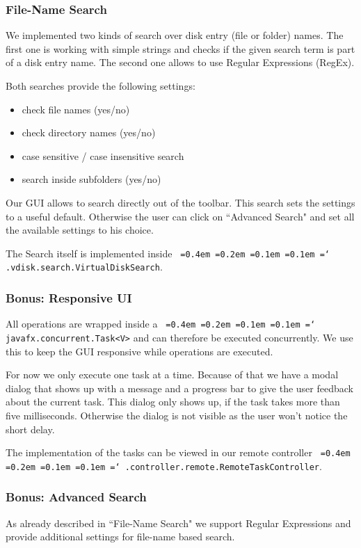 \documentclass[a4paper,12pt]{article}
\newcommand*\justify{%
  \fontdimen2\font=0.4em%
  \fontdimen3\font=0.2em%
  \fontdimen4\font=0.1em%
  \fontdimen7\font=0.1em%
  \hyphenchar\font=`\-%
}
\newcommand{\mono}[1]{\texttt{\justify #1}}
\begin{document}
\subsubsection{File-Name Search}
We implemented two kinds of search over disk entry (file or folder) names. The first one is working with simple strings and checks if the given search term is part of a disk entry name. The second one allows to use Regular Expressions (RegEx).

Both searches provide the following settings:
\begin{itemize}
    \item check file names (yes/no)
    \item check directory names (yes/no)
    \item case sensitive / case insensitive search
    \item search inside subfolders (yes/no)
\end{itemize}

Our GUI allows to search directly out of the toolbar. This search sets the settings to a useful default. Otherwise the user can click on ``Advanced Search" and set all the available settings to his choice.

The Search itself is implemented inside \mono{.vdisk.search.VirtualDiskSearch}.

\subsubsection{Bonus: Responsive UI}
All operations are wrapped inside a \mono{javafx.concurrent.Task<V>} and can therefore be executed concurrently. We use this to keep the GUI responsive while operations are executed.

For now we only execute one task at a time. Because of that we have a modal dialog that shows up with a message and a progress bar to give the user feedback about the current task. This dialog only shows up, if the task takes more than five milliseconds. Otherwise the dialog is not visible as the user won't notice the short delay.

The implementation of the tasks can be viewed in our remote controller \mono{.controller.remote.RemoteTaskController}.

\subsubsection{Bonus: Advanced Search}
As already described in ``File-Name Search" we support Regular Expressions and provide additional settings for file-name based search.
\end{document}
